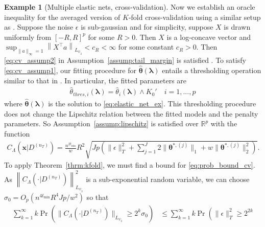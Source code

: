 \documentclass[12pt]{article} %
\theoremstyle{definition}
\newtheorem{example}{Example}
\begin{document}
\begin{example}[Multiple elastic nets, cross-validation]
	Now we establish an oracle inequality for the averaged version of $K$-fold cross-validation using a similar setup as \citet{lecue2012oracle}.
	Suppose the noise $\epsilon$ is sub-gaussian and for simplicity, suppose $X$ is drawn uniformly from $[-R, R]^p$ for some $R > 0$.
	Then $X$ is a log-concave vector and
	$
	\sup_{\|a\|_\infty = 1} \left\| X^\top a \right \|_{L_{\psi_2}} < c_R < \infty
	$
	for some constant $c_R > 0$.
	Then \eqref{eq:cv_assump2} in Assumption~\ref{assump:tail_margin} is satisfied \citep{lecue2012oracle}.
	To satisfy \eqref{eq:cv_assump1}, our fitting procedure for $\hat{\boldsymbol{\theta}}(\boldsymbol{\lambda})$ entails a thresholding operation similar to that in \citet{lecue2012oracle}.
	In particular, the fitted parameters are
	\begin{align}
	\hat{{\theta}}_{thres, i}(\boldsymbol{\lambda})
	= \hat{{\theta}}_{i}(\boldsymbol{\lambda}) \wedge K_0'
	\quad i = 1,...,p
	\end{align}
	where $\hat{\boldsymbol{\theta}}(\boldsymbol{\lambda})$ is the solution to \eqref{eq:elastic_net_ex}.
	This thresholding procedure does not change the Lipschitz relation between the fitted models and the penalty parameters.
	So Assumption~\ref{assump:lipschitz} is satisfied over $\mathbb{R}^p$ with the function
	\begin{align}
	C_\Lambda(\boldsymbol{x} | D^{(n_T)})
	=
	\frac{n^{2t_{\min}}}{w}
	R^2 \sqrt{
		J p
		\left(
		\|\epsilon\|_{T}^{2}
		+\sum_{j=1}^J
		2 \|\boldsymbol{\theta}^{*,(j)}\|_1
		+ w\|\boldsymbol{\theta}^{*,(j)}\|_2^2
		\right)
	}.
	\label{eq:elastic_lipschitz_cv}
	\end{align}
	\noindent
	To apply Theorem~\ref{thrm:kfold}, we must find a bound for \eqref{eq:prob_bound_cv}.
	As $\left \| C_\Lambda(\cdot | D^{(n_T)}) \right \|_{L_{\psi_2}}^2$ is a sub-exponential random variable, we can choose $\sigma_0 = O_p(n^{4t_{\min}}R^4Jp/w^2 )$ so that
	\begin{align}
	\sum_{k = 1}^\infty k \Pr \left (
	\| C_\Lambda(\cdot | D^{(n_T)}) \|_{L_{\psi_2}}
	\ge 2^k \sigma_0
	\right )
	& \le
	\sum_{k = 1}^\infty k \Pr \left (
	\| \epsilon\|_T^2 \ge
	2^{2k}

\end{align}
\end{example}
\end{document}

